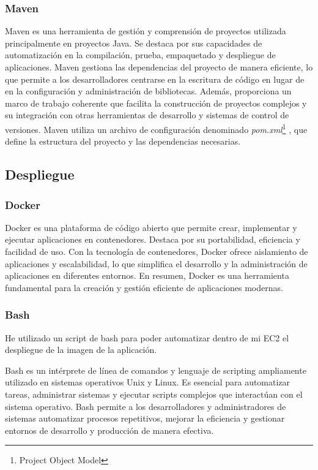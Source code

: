\subsubsection{Maven}
Maven es una herramienta de gestión y comprensión de proyectos utilizada principalmente en proyectos Java. Se destaca por sus capacidades de automatización
en la compilación, prueba, empaquetado y despliegue de aplicaciones. Maven gestiona las dependencias del proyecto de manera eficiente, lo que permite a los
desarrolladores centrarse en la escritura de código en lugar de en la configuración y administración de bibliotecas. Además, proporciona un marco de trabajo
coherente que facilita la construcción de proyectos complejos y su integración con otras herramientas de desarrollo y sistemas de control de versiones. Maven
utiliza un archivo de configuración denominado \textit{pom.xml}\footnote{Project Object Model} , que define la estructura del proyecto y las dependencias necesarias.

\subsection{Despliegue}

\subsubsection{Docker}
Docker\cite{Docker} es una plataforma de código abierto que permite crear, implementar y ejecutar aplicaciones en contenedores. Destaca por su portabilidad,
eficiencia y facilidad de uso. Con la tecnología de contenedores, Docker ofrece aislamiento de aplicaciones y escalabilidad, lo que simplifica el
desarrollo y la administración de aplicaciones en diferentes entornos. En resumen, Docker es una herramienta fundamental para la creación y gestión
eficiente de aplicaciones modernas.

\subsubsection{Bash}

He utilizado un script de bash para poder automatizar dentro de mi EC2 el despliegue de la imagen de la aplicación.

Bash es un intérprete de línea de comandos y lenguaje de scripting ampliamente utilizado en sistemas operativos Unix y Linux. Es esencial para automatizar
tareas, administrar sistemas y ejecutar scripts complejos que interactúan con el sistema operativo. Bash permite a los desarrolladores y administradores
de sistemas automatizar procesos repetitivos, mejorar la eficiencia y gestionar entornos de desarrollo y producción de manera efectiva. 

